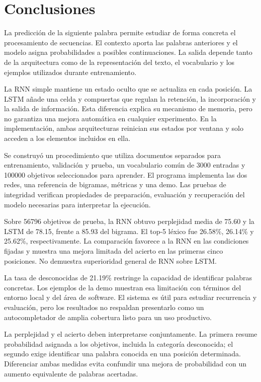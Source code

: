 \section{Conclusiones}
La predicción de la siguiente palabra permite estudiar de forma concreta el procesamiento de secuencias. El contexto aporta las palabras anteriores y el modelo asigna probabilidades a posibles continuaciones. La salida depende tanto de la arquitectura como de la representación del texto, el vocabulario y los ejemplos utilizados durante entrenamiento.

La RNN simple mantiene un estado oculto que se actualiza en cada posición. La LSTM añade una celda y compuertas que regulan la retención, la incorporación y la salida de información. Esta diferencia explica su mecanismo de memoria, pero no garantiza una mejora automática en cualquier experimento. En la implementación, ambas arquitecturas reinician sus estados por ventana y solo acceden a los elementos incluidos en ella.

Se construyó un procedimiento que utiliza documentos separados para entrenamiento, validación y prueba, un vocabulario común de 3000 entradas y 100000 objetivos seleccionados para aprender. El programa implementa las dos redes, una referencia de bigramas, métricas y una demo. Las pruebas de integridad verifican propiedades de preparación, evaluación y recuperación del modelo necesarias para interpretar la ejecución.

Sobre 56796 objetivos de prueba, la RNN obtuvo perplejidad media de 75.60 y la LSTM de 78.15, frente a 85.93 del bigrama. El top-5 léxico fue 26.58\%, 26.14\% y 25.62\%, respectivamente. La comparación favorece a la RNN en las condiciones fijadas y muestra una mejora limitada del acierto en las primeras cinco posiciones. No demuestra superioridad general de RNN sobre LSTM.

La tasa de desconocidas de 21.19\% restringe la capacidad de identificar palabras concretas. Los ejemplos de la demo muestran esa limitación con términos del entorno local y del área de software. El sistema es útil para estudiar recurrencia y evaluación, pero los resultados no respaldan presentarlo como un autocompletador de amplia cobertura listo para un uso productivo.

La perplejidad y el acierto deben interpretarse conjuntamente. La primera resume probabilidad asignada a los objetivos, incluida la categoría desconocida; el segundo exige identificar una palabra conocida en una posición determinada. Diferenciar ambas medidas evita confundir una mejora de probabilidad con un aumento equivalente de palabras acertadas.

